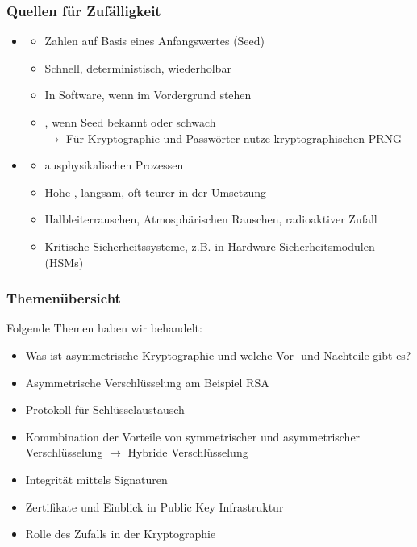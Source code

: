 \subsubsection*{Quellen für Zufälligkeit}
\begin{itemize}
    \item {}
    \begin{itemize}
        \item {}  Zahlen auf Basis eines Anfangswertes (Seed)
        \item {} Schnell, deterministisch, wiederholbar
        \item {} In Software, wenn  im Vordergrund stehen
        \item {} , wenn Seed bekannt oder schwach\\
        $\rightarrow$ Für Kryptographie und Passwörter nutze kryptographischen PRNG
    \end{itemize}
    \item {}
    \begin{itemize}
        \item {}  ausphysikalischen Prozessen
        \item {} Hohe , langsam, oft teurer in der Umsetzung
        \item {} Halbleiterrauschen, Atmosphärischen Rauschen, radioaktiver Zufall
        \item {} Kritische Sicherheitssysteme, z.B. in Hardware-Sicherheitsmodulen (HSMs)
    \end{itemize}
\end{itemize}
\subsubsection*{Themenübersicht}
Folgende Themen haben wir behandelt:
\begin{itemize}
    \item Was ist asymmetrische Kryptographie und welche Vor- und Nachteile gibt es?
    \item Asymmetrische Verschlüsselung am Beispiel RSA
    \item Protokoll für Schlüsselaustausch
    \item Kommbination der Vorteile von symmetrischer und asymmetrischer Verschlüsselung $\rightarrow$ Hybride Verschlüsselung
    \item Integrität mittels Signaturen
    \item Zertifikate und Einblick in Public Key Infrastruktur
    \item Rolle des Zufalls in der Kryptographie
\end{itemize}